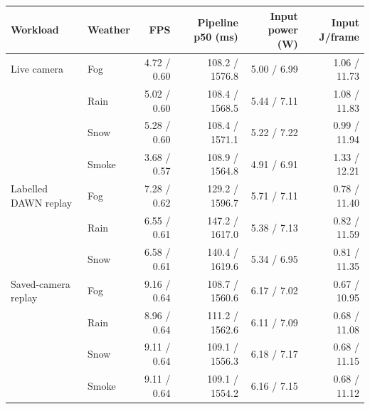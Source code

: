 \noindent\begin{minipage}{\linewidth}
\centering\small\renewcommand{\arraystretch}{1.12}\setlength{\tabcolsep}{3.5pt}
\label{tab:nano-runtime}
\begin{tabular}{@{}llrrrr@{}}\toprule
Workload & Weather & FPS & Pipeline p50 (ms) & Input power (W) & Input J/frame\\
\midrule
Live camera & Fog & 4.72 / 0.60 & 108.2 / 1576.8 & 5.00 / 6.99 & 1.06 / 11.73\\
 & Rain & 5.02 / 0.60 & 108.4 / 1568.5 & 5.44 / 7.11 & 1.08 / 11.83\\
 & Snow & 5.28 / 0.60 & 108.4 / 1571.1 & 5.22 / 7.22 & 0.99 / 11.94\\
 & Smoke & 3.68 / 0.57 & 108.9 / 1564.8 & 4.91 / 6.91 & 1.33 / 12.21\\
\midrule
Labelled DAWN replay & Fog & 7.28 / 0.62 & 129.2 / 1596.7 & 5.71 / 7.11 & 0.78 / 11.40\\
 & Rain & 6.55 / 0.61 & 147.2 / 1617.0 & 5.38 / 7.13 & 0.82 / 11.59\\
 & Snow & 6.58 / 0.61 & 140.4 / 1619.6 & 5.34 / 6.95 & 0.81 / 11.35\\
\midrule
Saved-camera replay & Fog & 9.16 / 0.64 & 108.7 / 1560.6 & 6.17 / 7.02 & 0.67 / 10.95\\
 & Rain & 8.96 / 0.64 & 111.2 / 1562.6 & 6.11 / 7.09 & 0.68 / 11.08\\
 & Snow & 9.11 / 0.64 & 109.1 / 1556.3 & 6.18 / 7.17 & 0.68 / 11.15\\
 & Smoke & 9.11 / 0.64 & 109.1 / 1554.2 & 6.16 / 7.15 & 0.68 / 11.12\\
\bottomrule
\end{tabular}
\end{minipage}\par

